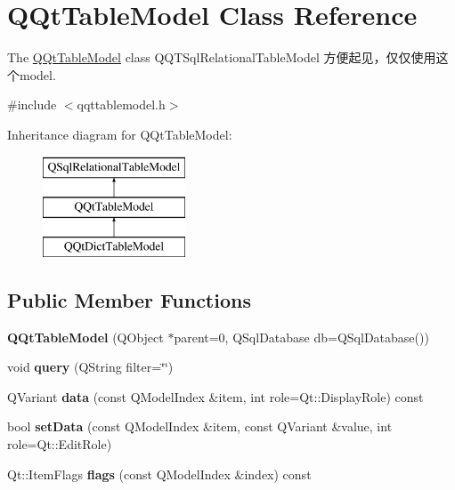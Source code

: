 \hypertarget{class_q_qt_table_model}{}\section{Q\+Qt\+Table\+Model Class Reference}
\label{class_q_qt_table_model}


The \mbox{\hyperlink{class_q_qt_table_model}{Q\+Qt\+Table\+Model}} class Q\+Q\+T\+Sql\+Relational\+Table\+Model 方便起见，仅仅使用这个model.  




{\ttfamily \#include $<$qqttablemodel.\+h$>$}

Inheritance diagram for Q\+Qt\+Table\+Model\+:\begin{figure}[H]
\begin{center}
\leavevmode
\includegraphics[height=3.000000cm]{class_q_qt_table_model}
\end{center}
\end{figure}
\subsection*{Public Member Functions}
\begin{DoxyCompactItemize}
\item 
\mbox{\label{class_q_qt_table_model_a8d8dcf5f348d990d0dae3b0947117d20}} 
{\bfseries Q\+Qt\+Table\+Model} (Q\+Object $\ast$parent=0, Q\+Sql\+Database db=Q\+Sql\+Database())
\item 
\mbox{\label{class_q_qt_table_model_a18d285e1ea5507c65085e35115c7b684}} 
void {\bfseries query} (Q\+String filter=\char`\"{}\char`\"{})
\item 
\mbox{\label{class_q_qt_table_model_a30586a50119c007d888d6f1a9480a77f}} 
Q\+Variant {\bfseries data} (const Q\+Model\+Index \&item, int role=Qt\+::\+Display\+Role) const
\item 
\mbox{\label{class_q_qt_table_model_a79011c20d02c82ed60a24247a7e6cb1c}} 
bool {\bfseries set\+Data} (const Q\+Model\+Index \&item, const Q\+Variant \&value, int role=Qt\+::\+Edit\+Role)
\item 
\mbox{\label{class_q_qt_table_model_a0c5feb1d88882a8610a64f7f40d47670}} 
Qt\+::\+Item\+Flags {\bfseries flags} (const Q\+Model\+Index \&index) const
\end{DoxyCompactItemize}


